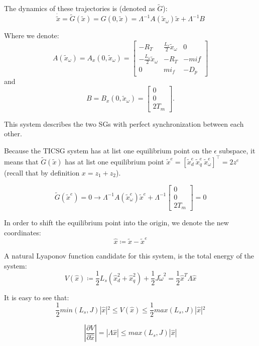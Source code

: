 \documentclass[conference]{IEEEtran}
\begin{document}
The dynamics of these trajectories is (denoted as $\tilde{G}$):
$$
\dot{\tilde{x}}=\tilde{G}(\tilde{x})=G(0,\tilde{x})=
 \Lambda^{-1} A\left( \tilde{x}_\omega \right) \tilde{x}+\Lambda^{-1} B 
$$

Where we denote:
$$
A\left( \tilde{x}_\omega \right)=A_x\left(0, \tilde{x}_\omega \right) =  
 \left[\begin{array}{ccc}
-R_T & \frac{L_{s}}{2}\tilde{x}_{\omega} & 0\\
-\frac{L_{s}}{2}\tilde{x}_{\omega} & -R_T & -mif\\
0 & mi_{f} & -D_{p}
\end{array}\right]
$$
and
$$
B = B_x\left(0, \tilde{x}_\omega \right)  =  
 \left[\begin{array}{c}
0\\
0\\
2T_{m}
\end{array}\right].
$$

This system describes the two SGs with perfect synchronization between each other.

Because the TICSG system has at list one equilibrium point on the $\epsilon$ subspace, it means that $\tilde{G}(\tilde{x})$ has at list one equilibrium point 
$\tilde{x}^{e}=\left[\tilde{x}_{d}^{e}\ \tilde{x}_{q}^{e}\ \tilde{x}_{\omega}^{e} \right]^\top = 2z^e$ (recall that by definition $x = z_1 + z_2$).

\begin{equation}
\tilde{G}(\tilde{x}^{e})=0\rightarrow\varLambda^{-1}A(\tilde{x}_{\omega}^{e})\tilde{x}^{e}+\varLambda^{-1}\left[\begin{array}{c}
0\\
0\\
2T_{m}
\end{array}\right]=0\label{eq:G_at_equilibrium}
\end{equation}

In order to shift the equilibrium point into the origin, we denote the new  coordinates:
$$
\hat{x}\coloneqq\tilde{x}-\tilde{x}^{e}
$$

A natural Lyaponov function candidate for this system, is the total energy of the system:
$$
V(\hat{x})\coloneqq\frac{1}{2}L_{s}\left(\hat{x}_{d}^{2}+\hat{x}_{q}^{2}\right)+\frac{1}{2}J\tilde{\omega}^{2}=\frac{1}{2}\hat{x}^{T}\varLambda\hat{x}
$$

It is easy to see that:
$$
\frac{1}{2} min(L_{s},J)|\hat{x}|{}^{2}\leq V(\hat{x})\leq \frac{1}{2} max(L_{s},J)|\hat{x}|{}^{2}
$$

$$
\left|\frac{\partial V}{\partial\hat{x}}\right|=\left|\varLambda\hat{x}\right|\leq max(L_{s},J)\left|\hat{x}\right|
$$
\end{document}
